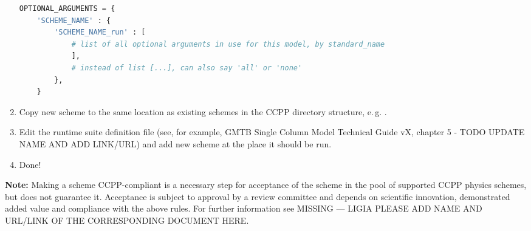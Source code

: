 \begin{enumerate}
\begin{lstlisting}[language=Python]
OPTIONAL_ARGUMENTS = {
    'SCHEME_NAME' : {
        'SCHEME_NAME_run' : [
            # list of all optional arguments in use for this model, by standard_name
            ],
            # instead of list [...], can also say 'all' or 'none'
        },
    }
\end{lstlisting}
\item Copy new scheme to the same location as existing schemes in the CCPP directory structure, e.\,g. .
\item Edit the runtime suite definition file (see, for example, {\red GMTB Single Column Model Technical Guide vX}, chapter 5 - TODO UPDATE NAME AND ADD LINK/URL) and add new scheme at the place it should be run.
\item Done!
\end{enumerate}
\textbf{Note:} Making a scheme CCPP-compliant is a necessary step for acceptance of the scheme in the pool of supported CCPP physics schemes, but does not guarantee it. Acceptance is subject to approval by a review committee and depends on scientific innovation, demonstrated added value and compliance with the above rules. For further information see {\red MISSING --- LIGIA PLEASE ADD NAME AND URL/LINK OF THE CORRESPONDING DOCUMENT HERE}.
